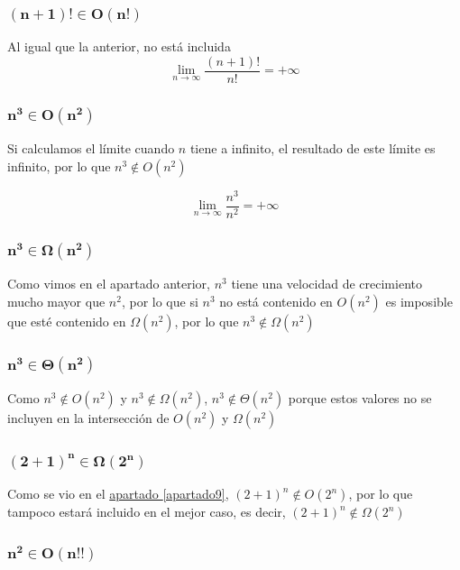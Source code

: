 \documentclass[10pt,a4paper,spanish]{report}
\theoremstyle{definition}
\theoremstyle{remark}
\begin{document}
\begin{multicols}{2}
\subsubsection{$\mathbf{(n+1)! \in O(n!)}$}

Al igual que la anterior, no está incluida
\begin{displaymath}
\lim_{n \rightarrow \infty} \frac{(n+1)!}{n!} = +\infty
\end{displaymath}

\subsubsection{$\mathbf{n^3 \in O(n^2)}$}


Si calculamos el límite cuando $n$ tiene a infinito, el resultado de este límite es infinito, por lo que $n^3 \notin O(n^2)$

\begin{displaymath}
\lim_{n \rightarrow \infty} \frac{n^3}{n^2} = +\infty
\end{displaymath}

\subsubsection{$\mathbf{n^3 \in \Omega(n^2)}$}


Como vimos en el apartado anterior, $n^3$ tiene una velocidad de crecimiento mucho mayor que $n^2$, por lo que si $n^3$ no está contenido en $O(n^2)$ es imposible que esté contenido en $\Omega(n^2)$, por lo que $n^3 \notin \Omega(n^2)$

\subsubsection{$\mathbf{n^3 \in \Theta(n^2)}$}


Como $n^3 \notin O(n^2)$ y $n^3 \notin \Omega(n^2)$, $n^3 \notin \Theta(n^2)$ porque estos valores no se incluyen en la intersección de $O(n^2)$ y $\Omega(n^2)$

\subsubsection{$\mathbf{(2+1)^n \in \Omega(2^n)}$}


Como se vio en el \hyperref[apartado9]{apartado \ref*{apartado9}}, $(2+1)^n \notin O(2^n)$, por lo que tampoco estará incluido en el mejor caso, es decir, $(2+1)^n \notin \Omega(2^n)$

\subsubsection{$\mathbf{n^2 \in O(n!!)}$}



\end{multicols}
\end{document}
